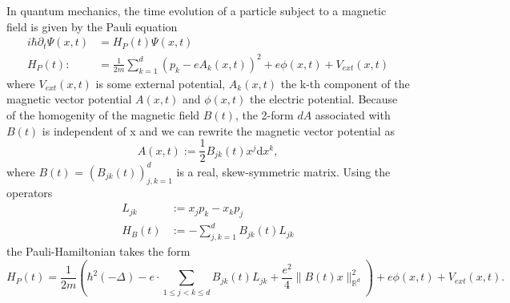 \documentclass[11pt, a4paper, oneside]{article}
\begin{document}
In quantum mechanics, the time evolution of a particle subject to a magnetic field is given by the Pauli equation
\begin{align} \label{eq_pauli}
  i \hbar \partial_t \Psi(x,t) &= H_P(t)\Psi(x,t) \\
  H_P(t) :&= \frac{1}{2m} \sum_{k=1}^d (p_k - e A_k(x,t))^2 + e\phi(x,t) + V_{ext}(x,t)
\end{align}
where $V_{ext}(x,t)$ is some external potential, $A_k(x,t)$ the k-th component of the magnetic vector potential $A(x,t)$ and $\phi(x,t)$ the electric potential.
Because of the homogenity of the magnetic field $B(t)$, the 2-form $dA$ associated with $B(t)$ is independent of x and we can rewrite the magnetic vector potential as
\begin{equation*}
  A(x,t) := \frac{1}{2}B_{jk}(t)x^j \textrm{d}x^k,
\end{equation*}
where $B(t)$ = $(B_{jk}(t))_{j,k = 1}^d$ is a real, skew-symmetric matrix. Using the operators
\begin{align}
  L_{jk} & := x_j p_k - x_k p_j \\
  H_B(t) & := - \sum_{j,k = 1}^d B_{jk}(t) L_{jk}
\end{align}
the Pauli-Hamiltonian takes the form
\begin{equation*}
  H_P(t) = \frac{1}{2 m} \left(\hbar^{2}(-\Delta)-e \cdot \sum_{1 \leqslant j<k \leqslant d} B_{j k}(t) L_{j k} +\frac{e^{2}}{4}\|B(t) x\|_{\mathbb{R}^{d}}^{2}  \right) + e \phi(x,t) + V_{ext}(x,t).
\end{equation*}
\end{document}
